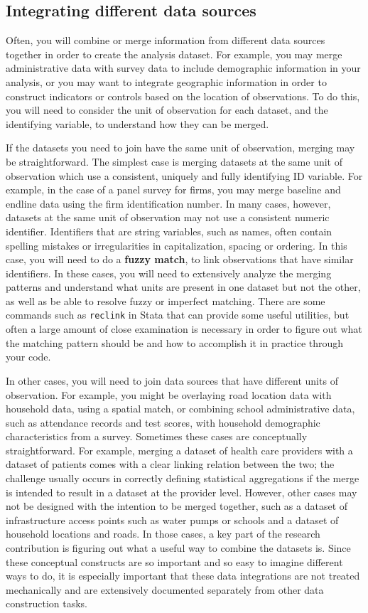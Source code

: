 \subsection{Integrating different data sources}
Often, you will combine or merge information from different data sources together
in order to create the analysis dataset.
For example, you may merge administrative data with survey data
to include demographic information in your analysis,
or you may want to integrate geographic information
in order to construct indicators or controls based on the location of observations.
To do this, you will need to consider the unit of observation for each dataset,
and the identifying variable, to understand how they can be merged.

If the datasets you need to join have the same unit of observation,
merging may be straightforward.
The simplest case is merging datasets at the same unit of observation
which use a consistent, uniquely and fully identifying ID variable. 
For example, in the case of a panel survey for firms,
you may merge baseline and endline data using the firm identification number.
In many cases, however, 
datasets at the same unit of observation may not use a consistent numeric identifier.
Identifiers that are string variables, such as names, 
often contain spelling mistakes or irregularities in capitalization, spacing or ordering. 
In this case, you will need to do a \textbf{fuzzy match}, 
to link observations that have similar identifiers. 
In these cases, you will need to extensively analyze the merging patterns
and understand what units are present in one dataset but not the other,
as well as be able to resolve fuzzy or imperfect matching.
There are some commands such as \texttt{reclink} in Stata
that can provide some useful utilities,
but often a large amount of close examination is necessary
in order to figure out what the matching pattern should be
and how to accomplish it in practice through your code.

In other cases, you will need to join data sources that have different units of observation.
For example, you might be overlaying road location data with household data,
using a spatial match,
or combining school administrative data, such as attendance records and test scores,
with household demographic characteristics from a survey.
Sometimes these cases are conceptually straightforward.
For example, merging a dataset of health care providers
with a dataset of patients comes with a clear linking relation between the two;
the challenge usually occurs in correctly defining statistical aggregations
if the merge is intended to result in a dataset at the provider level.
However, other cases may not be designed with the intention to be merged together,
such as a dataset of infrastructure access points such as water pumps or schools
and a dataset of household locations and roads.
In those cases, a key part of the research contribution is figuring out what
a useful way to combine the datasets is.
Since these conceptual constructs are so important
and so easy to imagine different ways to do,
it is especially important that these data integrations are not treated mechanically
and are extensively documented separately from other data construction tasks.

